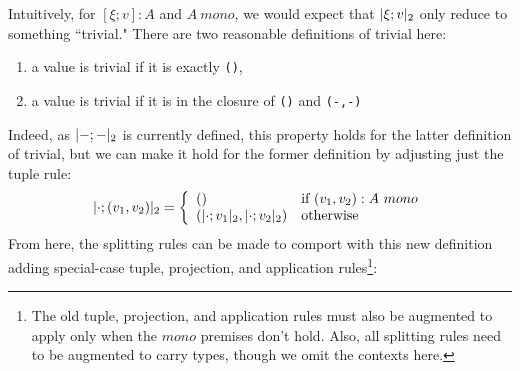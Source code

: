 Intuitively, for $[\xi;v] : A$ and $A~mono$, we would expect that $|\xi;v|_{ 2}$ only reduce to something ``trivial."
There are two reasonable definitions of trivial here: 
\begin{enumerate}
\item a value is trivial if it is exactly \texttt{()},
\item a value is trivial if it is in the closure of \texttt{()} and \texttt{(-,-)}
\end{enumerate}
Indeed, as $|-;-|_{ 2}$ is currently defined, this property holds for the latter definition of trivial,
but we can make it hold for the former definition by adjusting just the tuple rule:
\[
|\cdot;(v_1,v_2)|_{ 2} = \left\{ \begin{array}{ll} 
\mathtt{()} &\text{if } (v_1,v_2):A~mono\\ 
(|\cdot;v_1|_{ 2},|\cdot;v_2|_{ 2}) &\text{otherwise} \end{array} \right.
\]
From here, the splitting rules can be made to comport with this new 
definition adding special-case tuple, projection, and application 
rules\footnote{The old tuple, projection, and application rules 
must also be augmented to apply only when the $mono$ premises don't hold.
Also, all splitting rules need to be augmented to carry types, though
we omit the contexts here.}:
